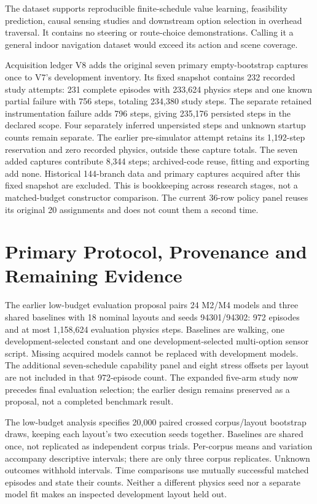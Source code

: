 The dataset supports reproducible finite-schedule value learning, feasibility
prediction, causal sensing studies and downstream option selection in overhead
traversal. It contains no steering or route-choice demonstrations. Calling it a
general indoor navigation dataset would exceed its action and scene coverage.

Acquisition ledger V8 adds the original seven primary empty-bootstrap captures
once to V7's development inventory. Its fixed snapshot contains 232 recorded
study attempts: 231 complete episodes with 233,624 physics steps and one known
partial failure with 756 steps, totaling 234,380 study steps. The separate
retained instrumentation failure adds 796 steps, giving 235,176 persisted steps
in the declared scope. Four separately inferred unpersisted steps and unknown
startup counts remain separate. The earlier pre-simulator attempt retains its
1,192-step reservation and zero recorded physics, outside these capture totals.
The seven added captures contribute 8,344 steps; archived-code reuse, fitting and
exporting add none. Historical 144-branch data and primary captures acquired
after this fixed snapshot are excluded. This is bookkeeping across research
stages, not a matched-budget constructor comparison. The current 36-row policy
panel reuses its original 20 assignments and does not count them a second time.

\section{Primary Protocol, Provenance and Remaining Evidence}
\label{app:protocol}
The earlier low-budget evaluation proposal pairs 24 M2/M4 models and three
shared baselines with 18 nominal layouts and seeds 94301/94302: 972 episodes and
at most 1,158,624 evaluation physics steps. Baselines are walking, one
development-selected constant and one development-selected multi-option sensor
script. Missing acquired models cannot be replaced with development models.
The additional seven-schedule capability panel and eight stress offsets per
layout are not included in that 972-episode count. The expanded five-arm study
now precedes final evaluation selection; the earlier design remains preserved
as a proposal, not a completed benchmark result.

The low-budget analysis specifies 20,000 paired crossed corpus/layout bootstrap
draws, keeping each layout's two execution seeds together. Baselines are shared
once, not replicated as independent corpus trials. Per-corpus means and variation
accompany descriptive intervals; there are only three corpus replicates.
Unknown outcomes withhold intervals. Time comparisons use mutually successful
matched episodes and state their counts. Neither a different physics seed nor
a separate model fit makes an inspected development layout held out.

